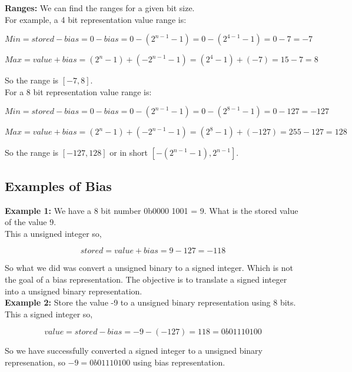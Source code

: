 \documentclass{article}
\begin{document}
\noindent \textbf{Ranges:} We can find the ranges for a given bit size. \\

\noindent For example, a 4 bit representation value range is:

\[
Min = stored - bias = 0 - bias = 0 - (2^{n-1} - 1) = 0 - (2^{4-1} - 1) = 0 - 7 = -7
\]

\[
Max = value + bias = (2^{n} - 1) + (-2^{n-1} - 1) = (2^{4} - 1) + (-7) = 15 - 7 = 8
\]

\noindent So the range is $[-7,8]$. \\

\noindent For a 8 bit representation value range is:

\[
Min = stored - bias = 0 - bias = 0 - (2^{n-1} - 1) = 0 - (2^{8-1} - 1) = 0 - 127 = -127
\]

\[
Max = value + bias = (2^{n} - 1) + (-2^{n-1} - 1) = (2^{8} - 1) + (-127) = 255 - 127 = 128
\]

\noindent So the range is $[-127,128]$ or in short $[-(2^{n-1} - 1), 2^{n-1}]$. \\

\subsection*{Examples of Bias}

\textbf{Example 1:} We have a 8 bit number 0b0000 1001 = 9. What is the stored value of the value 9. \\

This a unsigned integer so, 

\[
stored = value + bias = 9 - 127 = -118
\]

So what we did was convert a unsigned binary to a signed integer. Which is not the goal of a bias representation. The 
objective is to translate a signed integer into a unsigned binary representation. \\

\noindent \textbf{Example 2:} Store the value -9 to a unsigned binary representation using 8 bits. \\ 

This a signed integer so, 

\[
value = stored - bias = -9 -(-127) = 118 = 0b0111 0100
\]

So we have successfully converted a signed integer to a unsigned binary represenation, so $-9 = 0b0111 0100$ using bias 
representation. \\
\end{document}

